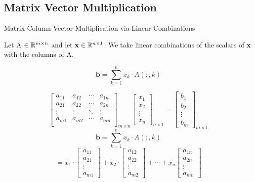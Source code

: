 \documentclass[12pt]{article}
\begin{document}
\subsection{Matrix Vector Multiplication}
\newpage
\begin{defin}{Matrix Column Vector Multiplication via Linear Combinations}

    Let A $\in \mathbb{R}^{m \times n}$ and let $\textbf{x} \in \mathbb{R}^{n \times 1}$. We take linear combinations of the scalars of \textbf{x} with the columns of A.

    \[
    \textbf{b} = \sum_{k=1}^{n}x_k \cdot A(:, k)
    \]

    \[
    \begin{bmatrix}
        a_{11} & a_{12} & \cdots & a_{1n} \\
        a_{21} & a_{22} & \cdots & a_{2n} \\
        \vdots & \vdots & \ddots & \vdots \\
        a_{m1} & a_{m2} & \cdots & a_{mn} \\
    \end{bmatrix}_{m \times n}
    \begin{bmatrix}
        x_1 \\
        x_2 \\
        \vdots \\
        x_n
    \end{bmatrix}_{n \times 1} = 
    \begin{bmatrix}
        b_1 \\
        b_2 \\
        \vdots \\
        b_m
    \end{bmatrix}_{m \times 1}
    \]
    \[
    \textbf{b} = \sum_{k=1}^n x_k \cdot A(:, k)
    \]
    \[
    =
    x_1 \cdot
    \begin{bmatrix}
        a_{11} \\ a_{21} \\ \vdots \\ a_{m1}
    \end{bmatrix}
    + x_2 \cdot
    \begin{bmatrix}
        a_{12} \\ a_{22} \\ \vdots \\ a_{m2}
    \end{bmatrix}
    + \cdots + x_n
    \begin{bmatrix}
        a_{1n} \\ a_{2n} \\ \vdots \\ a_{mn}
    \end{bmatrix}
    \]
\end{defin}
\end{document}
